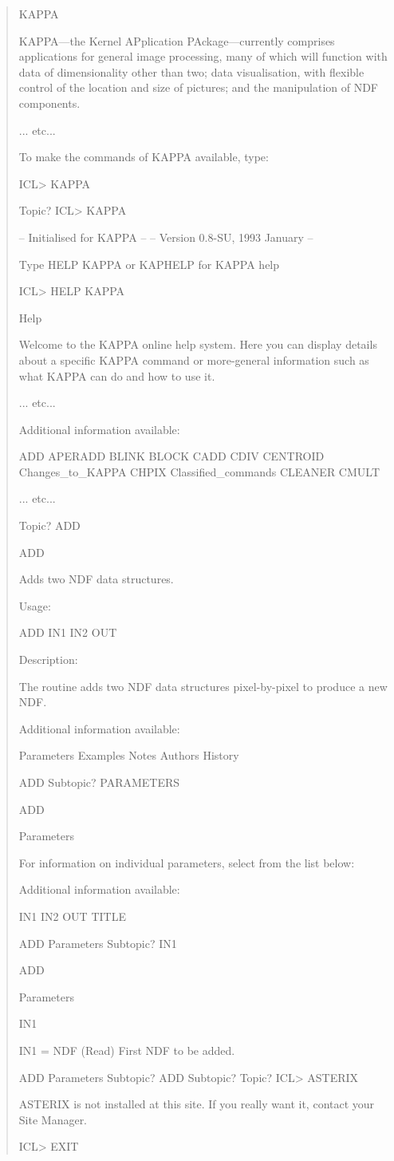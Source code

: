 \documentclass[twoside,11pt,nolof]{starlink}
\begin{document}
\begin{quote}
\begin{terminalv}
KAPPA

  KAPPA---the Kernel APplication PAckage---currently comprises applications for
  general image processing, many of which will function with data of
  dimensionality other than two; data visualisation, with flexible control of
  the location and size of pictures; and the manipulation of NDF components.

     ... etc...

  To make the commands of KAPPA available, type:

      ICL> KAPPA

Topic?
ICL> KAPPA

 --      Initialised for KAPPA      --
 --   Version 0.8-SU, 1993 January  --

 Type HELP KAPPA or KAPHELP for KAPPA help

ICL> HELP KAPPA

Help

   Welcome to the KAPPA online help system.  Here you can display
   details about a specific KAPPA command or more-general information
   such as what KAPPA can do and how to use it.

   ... etc...

  Additional information available:

  ADD        APERADD    BLINK      BLOCK      CADD       CDIV       CENTROID
  Changes_to_KAPPA      CHPIX      Classified_commands   CLEANER    CMULT

   ... etc...

Topic? ADD

ADD

  Adds two NDF data structures.

  Usage:

     ADD IN1 IN2 OUT

  Description:

     The routine adds two NDF data structures pixel-by-pixel to produce
     a new NDF.

  Additional information available:

  Parameters Examples    Notes      Authors    History

ADD Subtopic? PARAMETERS

ADD

  Parameters

    For information on individual parameters, select from the list below:

    Additional information available:

    IN1        IN2        OUT        TITLE

ADD Parameters Subtopic? IN1

ADD

  Parameters

    IN1

      IN1 = NDF (Read)
         First NDF to be added.

ADD Parameters Subtopic?
ADD Subtopic?
Topic?
ICL> ASTERIX

      ASTERIX  is not installed at this site.
   If you really want it, contact your Site Manager.

ICL> EXIT
%
\end{terminalv}
\end{quote}
\end{document}
